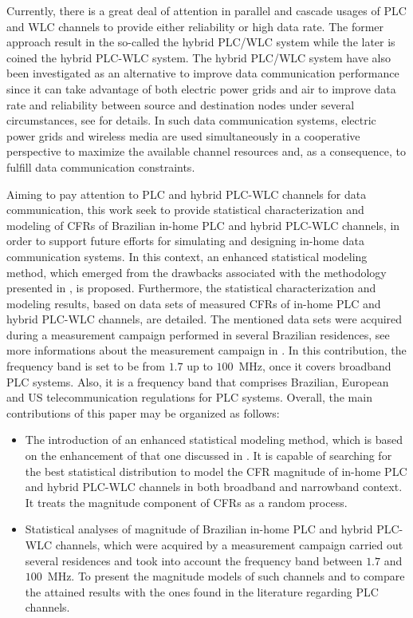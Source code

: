 \documentclass[journal]{IEEEtran}
\begin{document}
Currently, there is a great deal of attention in parallel and cascade usages of \ac{PLC} and \ac{WLC} channels to provide either reliability or high data rate. The former approach result in the so-called the hybrid \ac{PLC}/\ac{WLC} system while the later is coined the hybrid \ac{PLC}-\ac{WLC} system. The hybrid \ac{PLC}/\ac{WLC} system have also been investigated as an alternative to improve data communication performance \cite{Victor2017,Sayed2014} since it can take advantage of both electric power grids and air to improve data rate and reliability between source and destination nodes under several circumstances, see \cite{Dib} for details. In such data communication systems, electric power grids and wireless media are used simultaneously in a cooperative perspective to maximize the available channel resources and, as a consequence, to fulfill data communication constraints.

Aiming to pay attention to \ac{PLC} and hybrid \ac{PLC}-\ac{WLC} channels for data communication, this work seek to provide statistical characterization and modeling of \acp{CFR} of Brazilian in-home \ac{PLC} and hybrid \ac{PLC}-\ac{WLC} channels, in order to support future efforts for simulating and designing in-home data communication systems. In this context, an enhanced statistical modeling method, which emerged from the drawbacks associated with the methodology presented in \cite{Luis:AI,Luis:doc}, is proposed. Furthermore, the statistical characterization and modeling results, based on data sets of measured \acp{CFR} of in-home \ac{PLC} and hybrid \ac{PLC}-\ac{WLC} channels, are detailed.
The mentioned data sets were acquired during a measurement campaign performed in several Brazilian residences, see more informations about the measurement campaign in \cite{Thiago:Characterization,thiago:hyb,thiago:hyb2,thiago:doc}. In this contribution, the frequency band is set to be from $1.7$ up to $100$~MHz, once it covers broadband \ac{PLC} systems. Also, it is a frequency band that comprises Brazilian, European and US telecommunication regulations for \ac{PLC} systems. Overall, the main contributions of this paper may be organized as follows:

\begin{itemize}
	\item The introduction of an enhanced statistical modeling method, which is based on the enhancement of that one discussed in \cite{Luis:AI,Luis:doc}. It is capable of searching for the best statistical distribution to model the \ac{CFR} magnitude of in-home \ac{PLC} and hybrid \ac{PLC}-\ac{WLC} channels in both broadband and narrowband context. It treats the magnitude component of \acp{CFR} as a random process. 
	
	\item Statistical analyses of magnitude of Brazilian in-home \ac{PLC} and hybrid \ac{PLC}-\ac{WLC} channels, which were acquired by a measurement campaign carried out several residences and took into account the frequency band between $1.7$ and $100$~MHz. To present the magnitude models of such channels and to compare the attained results with the ones found in the literature regarding \ac{PLC} channels. 
\end{itemize}
\end{document}
